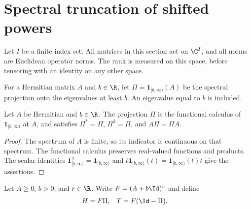 \section{Spectral truncation of shifted powers}
\label{sec:shifted_density_truncation}

Let $I$ be a finite index set. All matrices in this section act on $\C^I$,
and all norms are Euclidean operator norms. The rank is measured on this
space, before tensoring with an identity on any other space.


\begin{definition}
    \label{def:closed_threshold_projection}
    \leanok
    For a Hermitian matrix $A$ and $b\in\R$, let
    $\Pi=\mathbf1_{[b,\infty)}(A)$ be the spectral projection onto the
    eigenvalues at least $b$. An eigenvalue equal to $b$ is included.
\end{definition}

\begin{theorem}
    \label{thm:closed_threshold_projection}
    \leanok
    Let $A$ be Hermitian and $b\in\R$. The projection $\Pi$ is the
    functional calculus of $\mathbf1_{[b,\infty)}$ at $A$, and satisfies
    $\Pi^*=\Pi$, $\Pi^2=\Pi$, and $A\Pi=\Pi A$.
\end{theorem}

\begin{proof}
    \leanok
    The spectrum of $A$ is finite, so its indicator is continuous on that
    spectrum. The functional calculus preserves real-valued functions and
    products. The scalar identities $\mathbf1_{[b,\infty)}^2=
        \mathbf1_{[b,\infty)}$ and
    $t\mathbf{1}_{\lbrack b,\infty)}(t)=\mathbf{1}_{\lbrack b,\infty)}(t)t$
    give the assertions.
\end{proof}

\begin{definition}
    \label{def:shifted_power_head_tail}
    \leanok
    Let $A\ge0$, $b>0$, and $r\in\R$. Write $F=(A+b\Id)^r$ and define
    \begin{align}
        H & =F\Pi, & T & =F(\Id-\Pi).
        \label{eq:shifted_power_split_definition}
    \end{align}
\end{definition}

